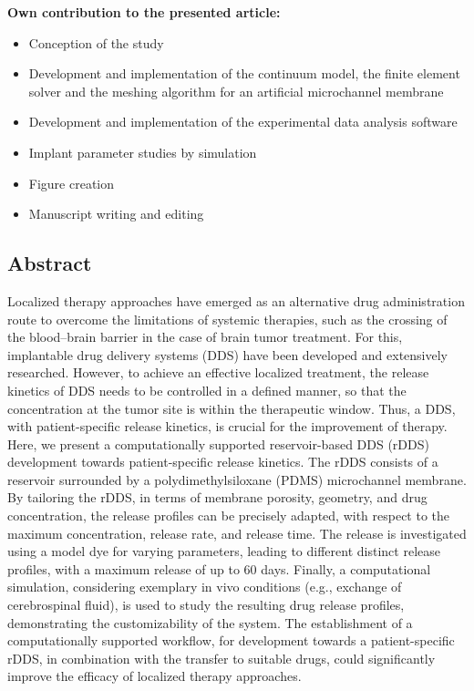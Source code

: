 \textbf{Own contribution to the presented article:}
\begin{itemize}
\item Conception of the study
\item Development and implementation of the continuum model, the finite element solver and the meshing algorithm for an artificial microchannel membrane
\item Development and implementation of the experimental data analysis software 
\item Implant parameter studies by simulation  
\item Figure creation 
\item Manuscript writing and editing
\end{itemize}

\newpage


\subsection*{Abstract}
Localized therapy approaches have emerged as an alternative drug administration route to overcome the limitations of systemic therapies, such as the crossing of the blood–brain barrier in the case of brain tumor treatment. For this, implantable drug delivery systems (DDS) have been developed and extensively researched. However, to achieve an effective localized treatment, the release kinetics of DDS needs to be controlled in a defined manner, so that the concentration at the tumor site is within the therapeutic window. Thus, a DDS, with patient-specific release kinetics, is crucial for the improvement of therapy. Here, we present a computationally supported reservoir-based DDS (rDDS) development towards patient-specific release kinetics. The rDDS consists of a reservoir surrounded by a polydimethylsiloxane (PDMS) microchannel membrane. By tailoring the rDDS, in terms of membrane porosity, geometry, and drug concentration, the release profiles can be precisely adapted, with respect to the maximum concentration, release rate, and release time. The release is investigated using a model dye for varying parameters, leading to different distinct release profiles, with a maximum release of up to 60 days. Finally, a computational simulation, considering exemplary in vivo conditions (e.g., exchange of cerebrospinal fluid), is used to study the resulting drug release profiles, demonstrating the customizability of the system. The establishment of a computationally supported workflow, for development towards a patient-specific rDDS, in combination with the transfer to suitable drugs, could significantly improve the efficacy of localized therapy approaches. \\

